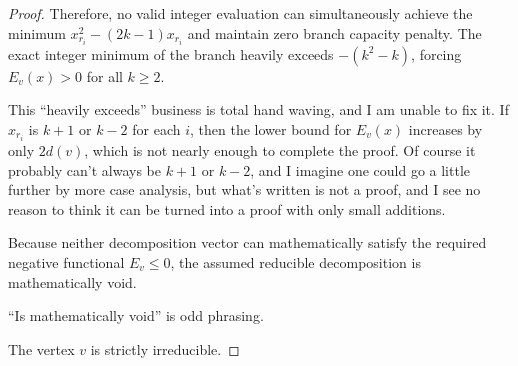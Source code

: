 \documentclass[12pt]{article}
\newcommand{\review}[1]{\begin{reviewbox}#1\end{reviewbox}}
\begin{document}
\begin{proof}
Therefore, no valid integer evaluation can simultaneously achieve the minimum $x_{r_i}^2 - (2k-1)x_{r_i}$ and maintain zero branch capacity penalty. The exact integer minimum of the branch heavily exceeds $-(k^2-k)$, forcing $E_v(x) > 0$ for all $k \ge 2$. 
\review{This ``heavily exceeds'' business is total hand waving, and I am unable to fix it. If $x_{r_i}$ is $k+1$ or $k-2$ for each $i$, then the lower bound for $E_v(x)$ increases by only $2d(v)$, which is not nearly enough to complete the proof. Of course it probably can't always be $k+1$ or $k-2$, and I imagine one could go a little further by more case analysis, but what's written is not a proof, and I see no reason to think it can be turned into a proof with only small additions.}
Because neither decomposition vector can mathematically satisfy the required negative functional $E_v \le 0$, the assumed reducible decomposition is mathematically void. 
\review{``Is mathematically void'' is odd phrasing.}
The vertex $v$ is strictly irreducible.
\end{proof}
\end{document}
